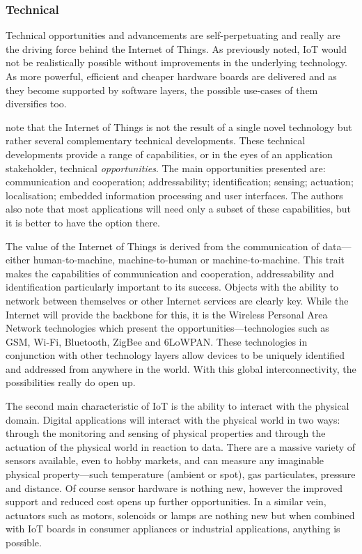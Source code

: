       \subsubsection{Technical}
        Technical opportunities and advancements are self-perpetuating and really are the driving force behind the Internet of Things. As previously noted, IoT would not be realistically possible without improvements in the underlying technology. As more powerful, efficient and cheaper hardware boards are delivered and as they become supported by software layers, the possible use-cases of them diversifies too.

        \citet{fromIoC} note that the Internet of Things is not the result of a single novel technology but rather several complementary technical developments. These technical developments provide a range of capabilities, or in the eyes of an application stakeholder, technical \emph{opportunities}. The main opportunities presented are: communication and cooperation; addressability; identification; sensing; actuation; localisation; embedded information processing and user interfaces. The authors also note that most applications will need only a subset of these capabilities, but it is better to have the option there.

        The value of the Internet of Things is derived from the communication of data---either human-to-machine, machine-to-human or machine-to-machine. This trait makes the capabilities of communication and cooperation, addressability and identification particularly important to its success. Objects with the ability to network between themselves or other Internet services are clearly key. While the Internet will provide the backbone for this, it is the Wireless Personal Area Network technologies which present the opportunities---technologies such as GSM, Wi-Fi, Bluetooth, ZigBee and 6LoWPAN. These technologies in conjunction with other technology layers allow devices to be uniquely identified and addressed from anywhere in the world. With this global interconnectivity, the possibilities really do open up.

        The second main characteristic of IoT is the ability to interact with the physical domain. Digital applications will interact with the physical world in two ways: through the monitoring and sensing of physical properties and through the actuation of the physical world in reaction to data. There are a massive variety of sensors available, even to hobby markets, and can measure any imaginable physical property---such temperature (ambient or spot), gas particulates, pressure and distance. Of course sensor hardware is nothing new, however the improved support and reduced cost opens up further opportunities. In a similar vein, actuators such as motors, solenoids or lamps are nothing new but when combined with IoT boards in consumer appliances or industrial applications, anything is possible.

